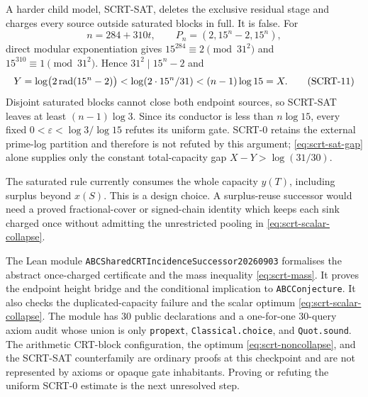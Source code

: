 A harder child model, SCRT-SAT, deletes the exclusive residual stage and
charges every source outside saturated blocks in full.  It is false.  For
\[
 n=284+310t,
 \qquad P_n=(2,15^n-2,15^n),
\]
direct modular exponentiation gives
$15^{284}\equiv2\pmod {31^2}$ and
$15^{310}\equiv1\pmod {31^2}$.  Hence $31^2\mid15^n-2$ and
\[
 Y=\log\bigl(2\operatorname{rad}(15^n-2)\bigr)
 <\log(2\cdot15^n/31)<(n-1)\log15=X.                        \tag{SCRT-11}\label{eq:scrt-sat-gap}
\]
Disjoint saturated blocks cannot close both endpoint sources, so SCRT-SAT
leaves at least $(n-1)\log3$.  Since its conductor is less than
$n\log15$, every fixed
$0<\varepsilon<\log3/\log15$ refutes its uniform gate.  SCRT-0 retains the
external prime-log partition and therefore is not refuted by this argument;
\eqref{eq:scrt-sat-gap} alone supplies only the constant total-capacity gap
$X-Y>\log(31/30)$.

The saturated rule currently consumes the whole capacity $y(T)$, including
surplus beyond $x(S)$.  This is a design choice.  A surplus-reuse successor
would need a proved fractional-cover or signed-chain identity which keeps
each sink charged once without admitting the unrestricted pooling in
\eqref{eq:scrt-scalar-collapse}.

The Lean module
\texttt{ABCSharedCRTIncidence\allowbreak Successor20260903} formalises the abstract
once-charged certificate and the mass inequality \eqref{eq:scrt-mass}.  It
proves the endpoint height bridge and the conditional implication to
\texttt{ABCConjecture}.  It also checks the duplicated-capacity failure and
the scalar optimum \eqref{eq:scrt-scalar-collapse}.  The module has $30$
public declarations and a one-for-one $30$-query axiom audit whose union is
only
\texttt{propext}, \texttt{Classical.choice}, and \texttt{Quot.sound}.  The
arithmetic CRT-block configuration, the optimum \eqref{eq:scrt-noncollapse}, and the
SCRT-SAT counterfamily are ordinary proofs at this checkpoint and are not
represented by axioms or opaque gate inhabitants.  Proving or refuting the
uniform SCRT-0 estimate is the next unresolved step.
